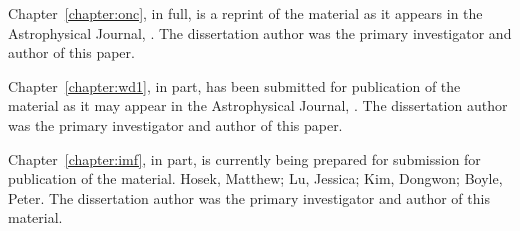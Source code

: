 \documentclass[12pt]{ucsddissertation}
\begin{document}
\begin{CJK*}{UTF8}{gbsn}
\begin{acknowledgements}
Chapter~\ref{chapter:onc}, in full, is a reprint of the material as it appears in the Astrophysical Journal, \citealt*{Wei-2024}. The dissertation author was the primary investigator and author of this paper.

Chapter~\ref{chapter:wd1}, in part, has been submitted for publication of the material as it may appear in the Astrophysical Journal, \citealt*{Wei-2025}. The dissertation author was the primary
investigator and author of this paper.

Chapter~\ref{chapter:imf}, in part, is currently being prepared for submission for publication of the material. Hosek, Matthew; Lu, Jessica; Kim, Dongwon; Boyle, Peter. The dissertation author was the primary investigator and author of this material.
\end{acknowledgements}



\end{CJK*}
\end{document}
